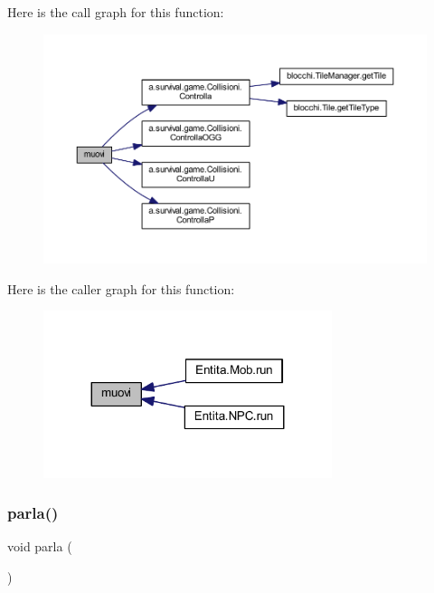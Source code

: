 Here is the call graph for this function\+:
\nopagebreak
\begin{figure}[H]
\begin{center}
\leavevmode
\includegraphics[width=350pt]{class_entita_1_1_entita_a1fe2f184b3cc7345c6a0f08d183a1d0b_cgraph}
\end{center}
\end{figure}
Here is the caller graph for this function\+:
\nopagebreak
\begin{figure}[H]
\begin{center}
\leavevmode
\includegraphics[width=239pt]{class_entita_1_1_entita_a1fe2f184b3cc7345c6a0f08d183a1d0b_icgraph}
\end{center}
\end{figure}
\mbox{\label{class_entita_1_1_entita_a8310c90e226ac9bc11547a3adb9cd0f3}} 
\subsubsection{\texorpdfstring{parla()}{parla()}}
{\footnotesize\ttfamily void parla (\begin{DoxyParamCaption}{ }\end{DoxyParamCaption})}



